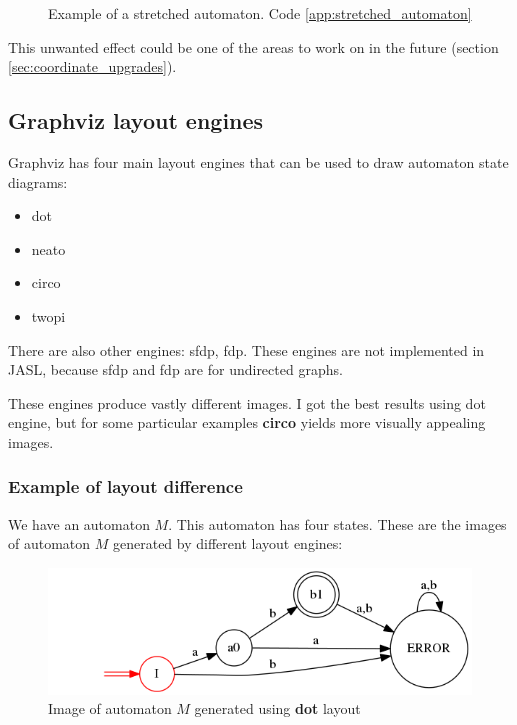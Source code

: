 \documentclass{ctuthesis}
\begin{document}
\begin{figure}[H]
\caption{Example of a stretched automaton. Code \ref{app:stretched_automaton}}
\label{fig:stretched_automaton}
\end{figure}

This unwanted effect could be one of the areas to work on in the future (section \ref{sec:coordinate_upgrades}).

\subsection{Graphviz layout engines}
Graphviz has four main layout engines that can be used to draw automaton state diagrams:
\begin{itemize}
	\item dot
	\item neato
	\item circo
	\item twopi
\end{itemize}

There are also other engines: sfdp, fdp. These engines are not implemented in JASL, because sfdp and fdp are for undirected graphs.

These engines produce vastly different images. I got the best results using dot engine, but for some particular examples \textbf{circo} yields more visually appealing images.
 
\subsubsection{Example of layout difference}
We have an automaton $M$. This automaton has four states. These are the images of automaton $M$ generated by different layout engines:

\begin{figure}[H]
\includegraphics[width=0.8\linewidth]{figures/layouts_dot.png}
\caption{Image of automaton $M$ generated using \textbf{dot} layout}
\label{fig:layout_diff_dot}
\end{figure}
\end{document}

